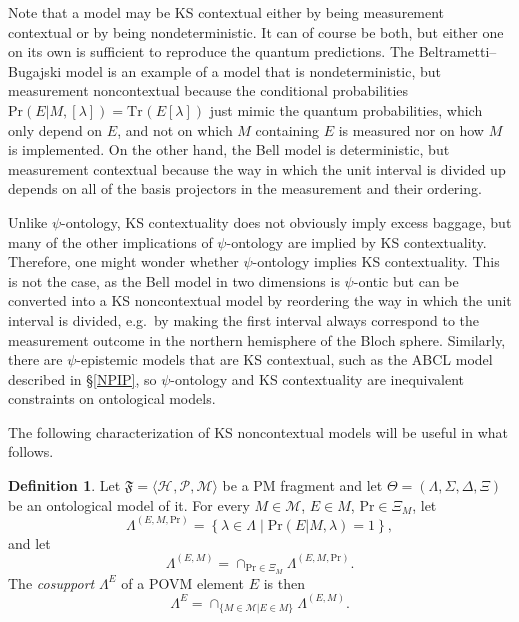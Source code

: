 \documentclass[DIV=calc,fontsize=12pt]{scrartcl} %
\theoremstyle{definition}
\newtheorem{definition}{Definition}[section]
\theoremstyle{plain}
\newcommand{\Proj}[1]{\ensuremath{\left [ #1 \right ]}}
\newcommand{\Hilb}[1][]{\ensuremath{\mathcal{H}_{#1}}}
\newcommand{\Tr}[2][]{\ensuremath{\text{Tr}_{#1} \left ( #2 \right )}}
\begin{document}
Note that a model may be KS contextual either by being measurement
contextual or by being nondeterministic.  It can of course be both,
but either one on its own is sufficient to reproduce the quantum
predictions.  The Beltrametti--Bugajski model is an example of a model
that is nondeterministic, but measurement noncontextual because the
conditional probabilities $\text{Pr}(E|M,\Proj{\lambda}) = \Tr{E
\Proj{\lambda}}$ just mimic the quantum probabilities, which only
depend on $E$, and not on which $M$ containing $E$ is measured nor on
how $M$ is implemented.  On the other hand, the Bell model is
deterministic, but measurement contextual because the way in which the
unit interval is divided up depends on all of the basis projectors in
the measurement and their ordering.

Unlike $\psi$-ontology, KS contextuality does not obviously imply
excess baggage, but many of the other implications of $\psi$-ontology
are implied by KS contextuality.  Therefore, one might wonder whether
$\psi$-ontology implies KS contextuality.  This is not the case, as
the Bell model in two dimensions is $\psi$-ontic but can be converted
into a KS noncontextual model by reordering the way in which the unit
interval is divided, e.g.\ by making the first interval always
correspond to the measurement outcome in the northern hemisphere of
the Bloch sphere.  Similarly, there are $\psi$-epistemic models that
are KS contextual, such as the ABCL model described in \S\ref{NPIP},
so $\psi$-ontology and KS contextuality are inequivalent constraints
on ontological models.

The following characterization of KS noncontextual models will be
useful in what follows.

\begin{definition}
\label{def:KS:cosupp}
Let $\mathfrak{F} = \langle \Hilb, \mathcal{P}, \mathcal{M} \rangle$
be a PM fragment and let $\Theta = (\Lambda, \Sigma, \Delta, \Xi)$
be an ontological model of it.  For every $M \in \mathcal{M}$, $E
\in M$, $\text{Pr} \in \Xi_M$, let
\begin{equation}
\Lambda^{(E,M,\text{Pr})} = \left \{ \lambda \in \Lambda \middle |
\text{Pr}(E|M,\lambda) = 1 \right \},
\end{equation}
and let
\begin{equation}
\Lambda^{(E,M)} = \cap_{\text{Pr} \in \Xi_M} \Lambda^{(E,M,\text{Pr})}.
\end{equation}
The \emph{cosupport} $\Lambda^E$ of a POVM element $E$ is then
\begin{equation}
\Lambda^E = \cap_{\{M \in \mathcal{M}|E \in M\}} \Lambda^{(E,M)}.
\end{equation}
\end{definition}
\end{document}
